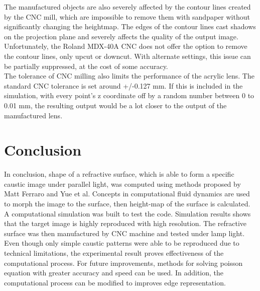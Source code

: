 \documentclass[10pt,two column]{configuration/unoesc}
\begin{document}
The manufactured objects are also severely affected by the contour lines created by the CNC mill, which are impossible to remove them with sandpaper without significantly changing the heightmap. The edges of the contour lines cast shadows on the projection plane and severely affects the quality of the output image. Unfortunately, the Roland MDX-40A CNC does not offer the option to remove the contour lines, only upcut or downcut. With alternate settings, this issue can be partially suppressed, at the cost of some accuracy.\\

The tolerance of CNC milling also limits the performance of the acrylic lens. The standard CNC tolerance is set around +/-0.127 mm. If this is included in the simulation, with every point's z coordinate off by a random number between 0 to 0.01 mm, the resulting output would be a lot closer to the output of the manufactured lens. \\

\section{Conclusion}
In conclusion, shape of a refractive surface, which is able to form a specific caustic image under parallel light, was computed using methods proposed by Matt Ferraro\cite{mattwebsite} and Yue et al\cite{yue2014poisson}. Concepts in computational fluid dynamics are used to morph the image to the surface, then height-map of the surface is calculated. A computational simulation was built to test the code. Simulation results shows that the target image is highly reproduced with high resolution. The refractive surface was then manufactured by CNC machine and tested under lamp light. Even though only simple caustic patterns were able to be reproduced due to technical limitations, the experimental result proves effectiveness of the computational process. For future improvements, methods for solving poisson equation with greater accuracy and speed can be used. In addition, the computational process can be modified to improves edge representation.

\printbibliography
\end{document}
